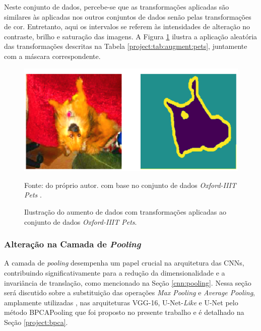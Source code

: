 Neste conjunto de dados, percebe-se que as transformações aplicadas são similares às aplicadas nos outros conjuntos de dados senão pelas transformações de cor. Entretanto, aqui os intervalos se referem às intensidades de alteração no contraste, brilho e saturação das imagens. A Figura \ref{project:fig:augment:pets} ilustra a aplicação aleatória das transformações descritas na Tabela \ref{project:tab:augment:pets}, juntamente com a máscara correspondente.

\begin{figure}[H]
    \centering
    \caption{Ilustração do aumento de dados com transformações aplicadas ao conjunto de dados \textit{Oxford-IIIT Pets}.}
    \label{project:fig:augment:pets}
    \includegraphics[width=1\textwidth]{recursos/imagens/project/dataaugmentation_pets.png}

    Fonte: do próprio autor. com base no conjunto de dados \textit{Oxford-IIIT Pets} \citep{Parkhi2012CatsDogs}.
\end{figure}


\subsubsection{Alteração na Camada de \textit{Pooling}}
\label{project:change_pooling}
A camada de \textit{pooling} desempenha um papel crucial na arquitetura das CNNs, contribuindo significativamente para a redução da dimensionalidade e a invariância de translação, como mencionado na Seção \ref{cnn:pooling}. Nessa seção será discutido sobre a substituição das operações \textit{Max Pooling} e \textit{Average Pooling}, amplamente utilizadas \citep{Ozdemir2023Avg-topk:Networks}, nas arquiteturas VGG-16, U-Net-\textit{Like} e U-Net pelo método BPCAPooling que foi proposto no presente trabalho e é detalhado na Seção \ref{project:bpca}.

